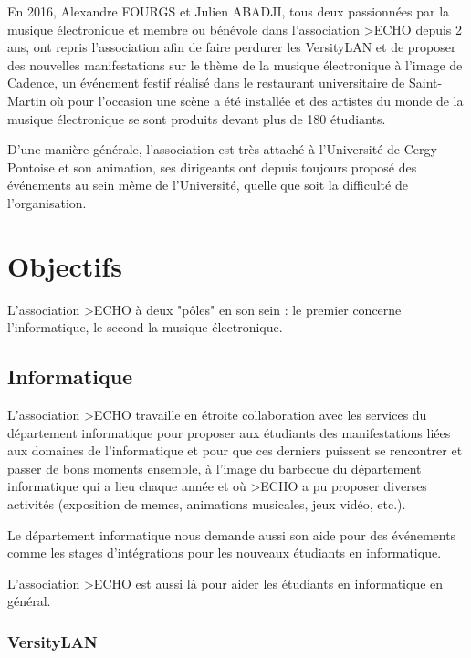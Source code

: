     En 2016, Alexandre FOURGS et Julien ABADJI, tous deux passionnées par la musique électronique et membre ou bénévole dans l'association >ECHO depuis 2 ans, ont repris l'association afin de faire perdurer les VersityLAN et de proposer des nouvelles manifestations sur le thème de la musique électronique à l'image de Cadence, un événement festif réalisé dans le restaurant universitaire de Saint-Martin où pour l'occasion une scène a été installée et des artistes du monde de la musique électronique se sont produits devant plus de 180 étudiants.
    
    D'une manière générale, l'association est très attaché à l'Université de Cergy-Pontoise et son animation, ses dirigeants ont depuis toujours proposé des événements au sein même de l'Université, quelle que soit la difficulté de l'organisation.
    
\newpage

\section{Objectifs}

    L'association >ECHO à deux "pôles" en son sein : le premier concerne l'informatique, le second la musique électronique.

    \subsection{Informatique}
    
        L'association >ECHO travaille en étroite collaboration avec les services du département informatique pour proposer aux étudiants des manifestations liées aux domaines de l'informatique et pour que ces derniers puissent se rencontrer et passer de bons moments ensemble, à l'image du barbecue du département informatique qui a lieu chaque année et où >ECHO a pu proposer diverses activités (exposition de memes, animations musicales, jeux vidéo, etc.).
        
        Le département informatique nous demande aussi son aide pour des événements comme les stages d'intégrations pour les nouveaux étudiants en informatique.
        
        L'association >ECHO est aussi là pour aider les étudiants en informatique en général.
        
        \subsubsection{VersityLAN}
        
